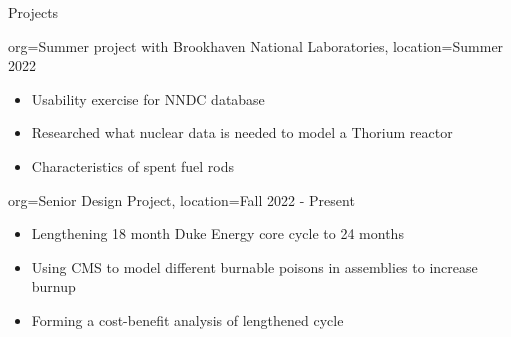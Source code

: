 \begin{ResumeSection}{Projects}
    \begin{ResumeSubsection}
        {
        org=Summer project with Brookhaven National Laboratories,
        location={Summer 2022}
    } 
        \begin{itemize}
            \item Usability exercise for NNDC database
            \item Researched what nuclear data is needed to model a Thorium reactor 
            \item Characteristics of spent fuel rods
        \end{itemize}
    \end{ResumeSubsection}
    \begin{ResumeSubsection}
        {
        org=Senior Design Project,
        location={Fall 2022 - Present}
    } 
        \begin{itemize}
            \item Lengthening 18 month Duke Energy core cycle to 24 months 
            \item Using CMS to model different burnable poisons in assemblies to increase burnup 
            \item Forming a cost-benefit analysis of lengthened cycle
        \end{itemize}
    \end{ResumeSubsection}
\end{ResumeSection}
